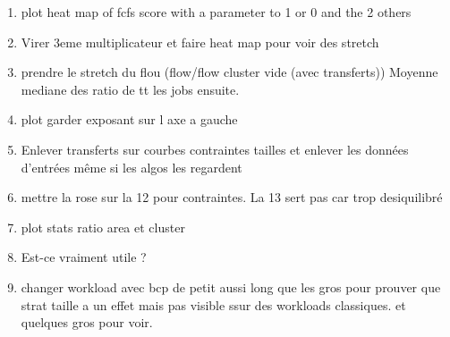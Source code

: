 \documentclass[a4paper]{article}
\begin{document}
\begin{enumerate}
			\item plot heat map of fcfs score with a parameter to 1 or 0 and the 2 others
			\item Virer 3eme multiplicateur et faire heat map pour voir des stretch
			\item prendre le stretch du flou (flow/flow cluster vide (avec transferts)) Moyenne mediane des ratio de tt les jobs ensuite.
			\item plot garder exposant sur l axe a gauche
			\item Enlever transferts sur courbes contraintes tailles et enlever les données d'entrées même si les algos les regardent
			\item mettre la rose sur la 12 pour contraintes. La 13 sert pas car trop desiquilibré
			\item plot stats ratio area et cluster
			\item Est-ce vraiment utile ?
			\item changer workload avec bcp de petit aussi long que les gros pour prouver que strat taille a un effet mais pas visible ssur des workloads classiques. et quelques gros pour voir.
			

\end{enumerate}
\end{document}

